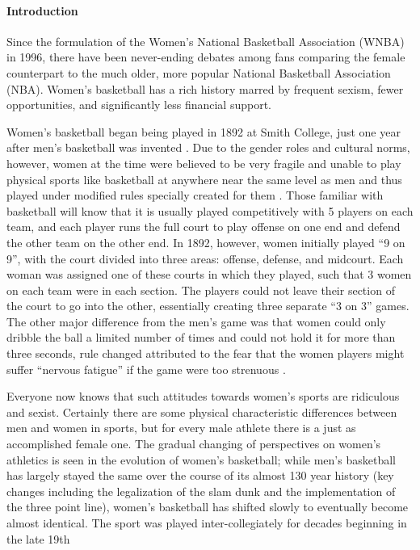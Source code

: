 \documentclass[12pt]{article}
\begin{document}
\paragraph{Introduction}
Since the formulation of the Women’s National Basketball Association (WNBA) in 1996, there have been never-ending debates 
among fans comparing the female counterpart to the much older, more popular National Basketball Association (NBA). 
Women’s basketball has a rich history marred by frequent sexism, fewer opportunities, and significantly less financial support.
\par
Women’s basketball began being played in 1892 at Smith College, just one year after men’s basketball was invented 
\cite{Shattering_The_Glass}. Due to the gender roles and cultural norms, however, women at the time were believed 
to be very fragile and unable to play physical sports like basketball at anywhere near the same level as men and 
thus played under modified rules specially created for them \cite{WNBA_Hist}. Those familiar with basketball will 
know that it is usually played competitively with 5 players on each team, and each player runs the full court to 
play offense on one end and defend the other team on the other end. In 1892, however, women initially played “9 on 9”, 
with the court divided into three areas: offense, defense, and midcourt. Each woman was assigned one of these courts 
in which they played, such that 3 women on each team were in each section. The players could not leave their section 
of the court to go into the other, essentially creating three separate “3 on 3” games. The other major difference 
from the men’s game was that women could only dribble the ball a limited number of times and could not hold it for 
more than three seconds, rule changed attributed to the fear that the women players might suffer “nervous fatigue” 
if the game were too strenuous \cite{WNBA_Hist}.
\par
Everyone now knows that such attitudes towards women’s sports are ridiculous and sexist. Certainly there are some physical 
characteristic differences between men and women in sports, but for every male athlete there is a just as accomplished 
female one. The gradual changing of perspectives on women’s athletics is seen in the evolution of women’s basketball; 
while men’s basketball has largely stayed the same over the course of its almost 130 year history (key changes including 
the legalization of the slam dunk and the implementation of the three point line), women’s basketball has shifted slowly 
to eventually become almost identical. The sport was played inter-collegiately for decades beginning in the late 19th 
\end{document}
